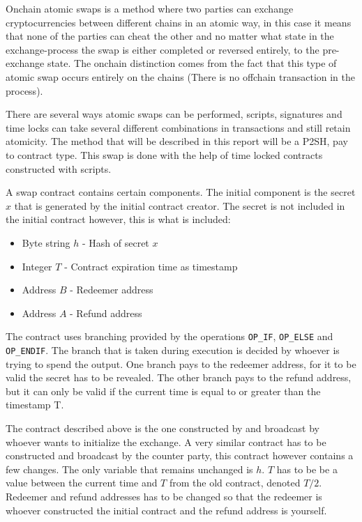 Onchain atomic swaps is a method where two parties can exchange cryptocurrencies between different chains in an atomic way, in this case it means that none of the parties can cheat the other and no matter what state in the exchange-process the swap is either completed or reversed entirely, to the pre-exchange state. The onchain distinction comes from the fact that this type of atomic swap occurs entirely on the chains (There is no offchain transaction in the process).

There are several ways atomic swaps can be performed, scripts, signatures and time locks can take several different combinations in transactions and still retain atomicity. The method that will be described in this report will be a P2SH, pay to contract type. This swap is done with the help of time locked contracts constructed with scripts. 

A swap contract contains certain components. The initial component is the secret $x$ that is generated by the initial contract creator. The secret is not included in the initial contract however, this is what is included:
\begin{itemize}
	\item Byte string $h$ \quad - \quad Hash of secret $x$
	\item Integer $T$ \quad\quad - \quad Contract expiration time as timestamp
	\item Address $B$ \quad - \quad Redeemer address
	\item Address $A$ \quad - \quad Refund address
\end{itemize}

The contract uses branching provided by the operations \texttt{OP\_IF}, \texttt{OP\_ELSE} and \texttt{OP\_ENDIF}. The branch that is taken during execution is decided by whoever is trying to spend the output. One branch pays to the redeemer address, for it to be valid the secret has to be revealed. The other branch pays to the refund address, but it can only be valid if the current time is equal to or greater than the timestamp T.

The contract described above is the one constructed by and broadcast by whoever wants to initialize the exchange. A very similar contract has to be constructed and broadcast by the counter party, this contract however contains a few changes. The only variable that remains unchanged is $h$. $T$ has to be be a value between the current time and $T$ from the old contract, denoted $T/2$. Redeemer and refund addresses has to be changed so that the redeemer is whoever constructed the initial contract and the refund address is yourself.

